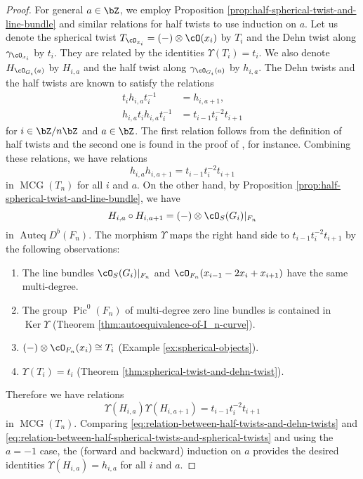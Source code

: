 \documentclass[12pt]{amsart}
\numberwithin{equation}{section}
\theoremstyle{plain}
\theoremstyle{definition}
\DeclareMathOperator{\Auteq}{\mathrm{Auteq}}
\DeclareMathOperator{\Pic}{\mathrm{Pic}}
\DeclareMathOperator{\MCG}{\mathrm{MCG}}
\DeclareMathOperator{\Ker}{\mathrm{Ker}}
\begin{document}
\begin{proof}
    For general $a \in \bZ$, we employ Proposition \ref{prop:half-spherical-twist-and-line-bundle} and similar relations for half twists to use induction on $a$.
    Let us denote the spherical twist $T_{\cO_{x_i}} = (-)\otimes \cO(x_i)$ by $T_i$ and the Dehn twist along $\gamma_{\cO_{x_i}}$ by $t_i$.
    They are related by the identities $\Upsilon(T_i) = t_i$.
    We also denote $H_{\cO_{G_i}(a)}$ by $H_{i, a}$ and the half twist along $\gamma_{\cO_{G_i}(a)}$ by $h_{i, a}$.
    The Dehn twists and the half twists are known to satisfy the relations
    \begin{align}
        t_i h_{i, a} t_i^{-1}          & = h_{i, a+1},            \\
        h_{i, a} t_i h_{i, a} t_i^{-1} & = t_{i-1}t_i^{-2}t_{i+1}
    \end{align}
    for $i \in \bZ/n\bZ$ and $a \in \bZ$.
    The first relation follows from the definition of half twists and the second one is found in the proof of \cite[Corollary 2.11]{MR1805936}, for instance.
    Combining these relations, we have relations
    \begin{equation}\label{eq:relation-between-half-twists-and-dehn-twists}
        h_{i, a}h_{i, a+1} = t_{i-1}t_i^{-2}t_{i+1}
    \end{equation}
    in $\MCG(T_n)$ for all $i$ and $a$.
    On the other hand, by Proposition \ref{prop:half-spherical-twist-and-line-bundle}, we have
    \begin{equation}
        H_{i, a}\circ H_{i, a+1} = (-)\otimes \cO_S(G_i)\lvert_{F_n}
    \end{equation}
    in $\Auteq D^b(F_n)$.
    The morphism $\Upsilon$ maps the right hand side to $t_{i-1}t_i^{-2}t_{i+1}$ by the following observations:
    \begin{enumerate}
        \item The line bundles $\cO_S(G_i)\lvert_{F_n}$ and $\cO_{F_n}(x_{i-1}-2x_{i}+x_{i+1})$ have the same multi-degree.
        \item The group $\Pic^0(F_n)$ of multi-degree zero line bundles is contained in $\Ker \Upsilon$ (Theorem \ref{thm:autoequivalence-of-I_n-curve}).
        \item $(-) \otimes \cO_{F_n}(x_i) \cong T_i$ (Example \ref{ex:spherical-objects}).
        \item $\Upsilon(T_i) = t_i$ (Theorem \ref{thm:spherical-twist-and-dehn-twist}).
    \end{enumerate}
    Therefore we have relations
    \begin{equation}\label{eq:relation-between-half-spherical-twists-and-spherical-twists}
        \Upsilon(H_{i, a})\Upsilon(H_{i, a+1}) = t_{i-1}t_i^{-2}t_{i+1}
    \end{equation}
    in $\MCG(T_n)$.
    Comparing \eqref{eq:relation-between-half-twists-and-dehn-twists} and \eqref{eq:relation-between-half-spherical-twists-and-spherical-twists} and using the $a = -1$ case, the (forward and backward) induction on $a$ provides the desired identities $\Upsilon(H_{i, a}) = h_{i, a}$ for all $i$ and $a$.
\end{proof}
\end{document}
